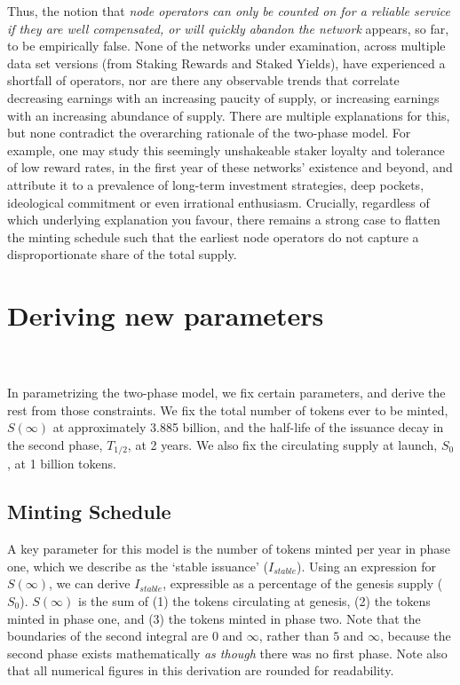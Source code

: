 \documentclass[8pt]{article}
\begin{document}
Thus, the notion that \textit{node operators can only be counted on for a reliable service if they are well compensated, or will quickly abandon the network} appears, so far, to be empirically false. None of the networks under examination, across multiple data set versions (from Staking Rewards and Staked Yields), have experienced a shortfall of operators, nor are there any observable trends that correlate decreasing earnings with an increasing paucity of supply, or increasing earnings with an increasing abundance of supply. There are multiple explanations for this, but none contradict the overarching rationale of the two-phase model. For example, one may study this seemingly unshakeable staker loyalty and tolerance of low reward rates, in the first year of these networks' existence and beyond, and attribute it to a prevalence of long-term investment strategies, deep pockets, ideological commitment or even irrational enthusiasm. Crucially, regardless of which underlying explanation you favour, there remains a strong case to flatten the minting schedule such that the earliest node operators do not capture a disproportionate share of the total supply.

\section{Deriving new parameters}

\\\\
In parametrizing the two-phase model, we fix certain parameters, and derive the rest from those constraints. We fix the total number of tokens ever to be minted, $S(\infty)$ at approximately 3.885 billion, and the half-life of the issuance decay in the second phase, $T_{1/2}$, at 2 years. We also fix the circulating supply at launch, $S_0$, at 1 billion tokens.

\subsection{Minting Schedule}
A key parameter for this model is the number of tokens minted per year in phase one, which we describe as the `stable issuance' ($I_{stable}$). Using an expression for $S(\infty)$, we can derive $I_{stable}$, expressible as a percentage of the genesis supply ($S_0$). $S(\infty)$ is the sum of (1) the tokens circulating at genesis, (2) the tokens minted in phase one, and (3) the tokens minted in phase two. Note that the boundaries of the second integral are $0$ and $\infty$, rather than $5$ and $\infty$, because the second phase exists mathematically \textit{as though} there was no first phase. Note also that all numerical figures in this derivation are rounded for readability.
\end{document}

